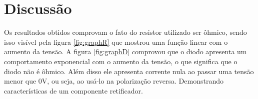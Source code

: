 \section{Discussão}
    Os resultados obtidos comprovam o fato do resistor 
    utilizado ser ôhmico, sendo isso visível pela figura 
    \ref{fig:graphR} que mostrou uma função linear com o aumento da tensão.
    \newline
    A figura \ref{fig:graphD} comprovou que o diodo apresenta um comportamento
    exponencial com o aumento da tensão, o que significa que o diodo não é ôhmico.
    Além disso ele apresenta corrente nula ao passar uma tensão menor que 0V, ou seja,
    ao usá-lo na polarização reversa. Demonstrando características de um componente retificador.

    

